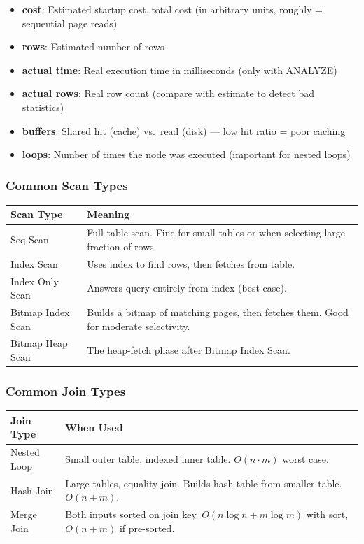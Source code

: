 \documentclass[12pt,a4paper]{article}
\begin{document}
\begin{itemize}
    \item \textbf{cost}: Estimated startup cost..total cost (in arbitrary units, roughly = sequential page reads)
    \item \textbf{rows}: Estimated number of rows
    \item \textbf{actual time}: Real execution time in milliseconds (only with ANALYZE)
    \item \textbf{actual rows}: Real row count (compare with estimate to detect bad statistics)
    \item \textbf{buffers}: Shared hit (cache) vs.\ read (disk) --- low hit ratio = poor caching
    \item \textbf{loops}: Number of times the node was executed (important for nested loops)
\end{itemize}

\subsubsection{Common Scan Types}

\begin{center}
\begin{tabular}{lp{8cm}}
\toprule
\textbf{Scan Type} & \textbf{Meaning} \\
\midrule
Seq Scan & Full table scan. Fine for small tables or when selecting large fraction of rows. \\
Index Scan & Uses index to find rows, then fetches from table. \\
Index Only Scan & Answers query entirely from index (best case). \\
Bitmap Index Scan & Builds a bitmap of matching pages, then fetches them. Good for moderate selectivity. \\
Bitmap Heap Scan & The heap-fetch phase after Bitmap Index Scan. \\
\bottomrule
\end{tabular}
\end{center}

\subsubsection{Common Join Types}

\begin{center}
\begin{tabular}{lp{8cm}}
\toprule
\textbf{Join Type} & \textbf{When Used} \\
\midrule
Nested Loop & Small outer table, indexed inner table. $O(n \cdot m)$ worst case. \\
Hash Join & Large tables, equality join. Builds hash table from smaller table. $O(n + m)$. \\
Merge Join & Both inputs sorted on join key. $O(n \log n + m \log m)$ with sort, $O(n + m)$ if pre-sorted. \\
\bottomrule
\end{tabular}
\end{center}
\end{document}
